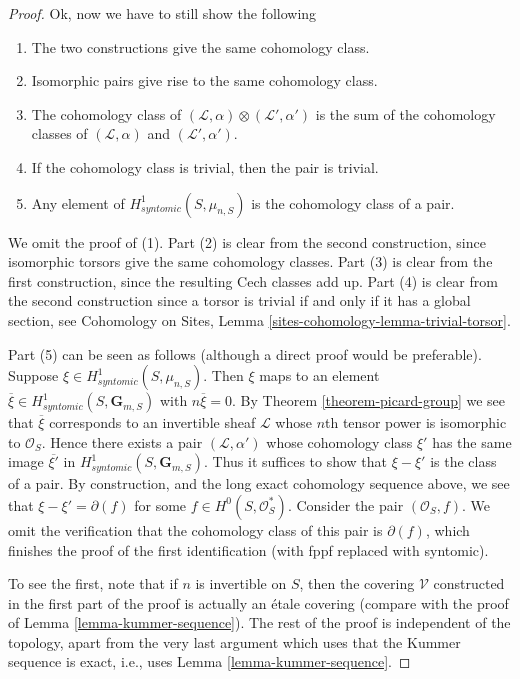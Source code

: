 \begin{proof}
\medskip\noindent
Ok, now we have to still show the following
\begin{enumerate}
\item The two constructions give the same cohomology class.
\item Isomorphic pairs give rise to the same cohomology class.
\item The cohomology class of
$(\mathcal{L}, \alpha) \otimes (\mathcal{L}', \alpha')$
is the sum of the cohomology classes of
$(\mathcal{L}, \alpha)$ and $(\mathcal{L}', \alpha')$.
\item If the cohomology class is trivial, then the pair is trivial.
\item Any element of $H^1_{syntomic}(S, \mu_{n, S})$ is the
cohomology class of a pair.
\end{enumerate}
We omit the proof of (1). Part (2) is clear from the second construction,
since isomorphic torsors give the same cohomology classes.
Part (3) is clear from the first construction, since the resulting
Cech classes add up. Part (4) is clear from the second construction
since a torsor is trivial if and only if it has a global section, see
Cohomology on Sites, Lemma \ref{sites-cohomology-lemma-trivial-torsor}.

\medskip\noindent
Part (5) can be seen as follows (although a direct proof would be
preferable). Suppose $\xi \in H^1_{syntomic}(S, \mu_{n, S})$.
Then $\xi$ maps to an element
$\overline{\xi} \in H^1_{syntomic}(S, \mathbf{G}_{m, S})$
with $n \overline{\xi} = 0$. By
Theorem \ref{theorem-picard-group}
we see that $\overline{\xi}$ corresponds to an invertible sheaf $\mathcal{L}$
whose $n$th tensor power is isomorphic to $\mathcal{O}_S$.
Hence there exists a pair $(\mathcal{L}, \alpha')$ whose cohomology
class $\xi'$ has the same image $\overline{\xi'}$ in
$H^1_{syntomic}(S, \mathbf{G}_{m, S})$. Thus it suffices to show
that $\xi - \xi'$ is the class of a pair. By construction, and the
long exact cohomology sequence above, we see that
$\xi - \xi' = \partial(f)$ for some $f \in H^0(S, \mathcal{O}_S^*)$.
Consider the pair $(\mathcal{O}_S, f)$. We omit the verification
that the cohomology class of this pair is $\partial(f)$, which
finishes the proof of the first identification (with fppf replaced
with syntomic).

\medskip\noindent
To see the first, note that if $n$ is invertible on $S$, then the
covering $\mathcal{V}$ constructed in the first part of the proof
is actually an \'etale covering (compare with the proof of
Lemma \ref{lemma-kummer-sequence}). The rest of the proof is independent
of the topology, apart from the very last argument which uses that
the Kummer sequence is exact, i.e., uses Lemma \ref{lemma-kummer-sequence}.
\end{proof}






